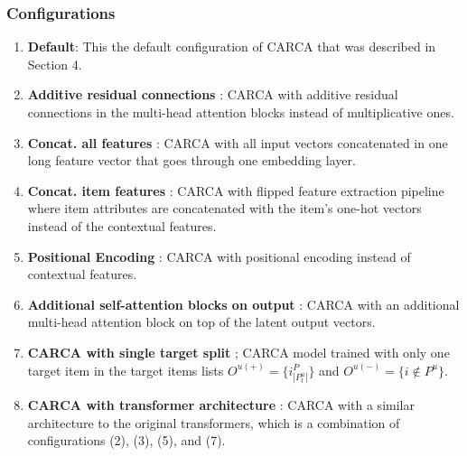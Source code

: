 \documentclass[sigconf,natbib=true]{acmart}
\begin{document}
\subsubsection{Configurations}
\begin{enumerate}

 \item \textbf{Default}: This the default configuration of CARCA that was described in Section 4.
  \item \textbf{Additive residual connections }: CARCA with additive residual connections in the multi-head attention blocks instead of multiplicative ones.
  \item \textbf{Concat. all features }: CARCA with all input vectors concatenated in one long feature vector that goes through one embedding layer.
   \item \textbf{Concat. item features }: CARCA with flipped feature extraction pipeline where item attributes are concatenated with the item's one-hot vectors instead of the contextual features.
\item \textbf{Positional Encoding }: CARCA with positional encoding instead of contextual features.
\item \textbf{Additional self-attention blocks on output }: CARCA with an additional multi-head attention block on top of the latent output vectors.
\item \textbf{CARCA with single target split } ; CARCA model trained with only one target item in the target items lists $O^{u(+)} =\{i^{P}_{|P^{u}_{t}|}\}$ and $O^{u(-)} = \{i \notin P^{u}\}$.
\item \textbf{CARCA with transformer architecture }: CARCA with a similar architecture to the original transformers, which is a combination of configurations (2), (3), (5), and (7).

\end{enumerate}
\end{document}

